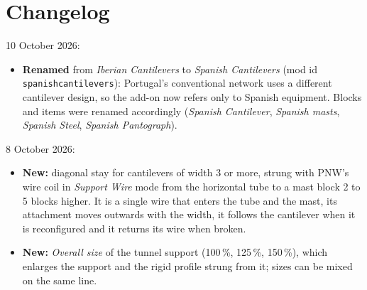 \documentclass[11pt,a4paper]{article}
\begin{document}
\section*{Changelog}
10 October 2026:
  \begin{itemize}
    \item \textbf{Renamed} from \emph{Iberian Cantilevers} to \emph{Spanish Cantilevers} (mod id
          \texttt{spanishcantilevers}): Portugal's conventional network uses a different cantilever design, so
          the add-on now refers only to Spanish equipment. Blocks and items were renamed accordingly
          (\emph{Spanish Cantilever}, \emph{Spanish masts}, \emph{Spanish Steel}, \emph{Spanish Pantograph}).
  \end{itemize}
8 October 2026:
  \begin{itemize}
    \item \textbf{New:} diagonal stay for cantilevers of width 3 or more, strung with PNW's wire coil in
          \emph{Support Wire} mode from the horizontal tube to a mast block 2 to 5 blocks higher. It is a single
          wire that enters the tube and the mast, its attachment moves outwards with the width, it follows the
          cantilever when it is reconfigured and it returns its wire when broken.
    \item \textbf{New:} \emph{Overall size} of the tunnel support (100\,\%, 125\,\%, 150\,\%), which enlarges the
          support and the rigid profile strung from it; sizes can be mixed on the same line.
  \end{itemize}
\end{document}
